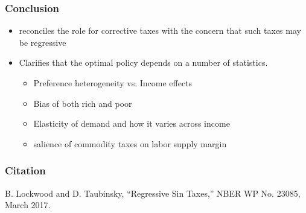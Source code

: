 \documentclass{beamer}
\begin{document}
\begin{frame}
\frametitle{Conclusion} 

\begin{itemize}
	\item reconciles the role for corrective taxes with the concern that such taxes may be regressive
	\item Clarifies that the optimal policy depends on a number of statistics. 
	\begin{itemize}
		\item Preference heterogeneity vs. Income effects 
		\item Bias of both rich and poor 
		\item Elasticity of demand and how it varies across income
		\item salience of commodity taxes on labor supply margin 
	\end{itemize}

\end{itemize}

\end{frame}
	
	
	\begin{frame}
	\frametitle{Citation} 
	
	B. Lockwood and D. Taubinsky, “Regressive Sin Taxes,” NBER WP No. 23085, March 2017.
	
	\end{frame}
	
	
\end{document}
